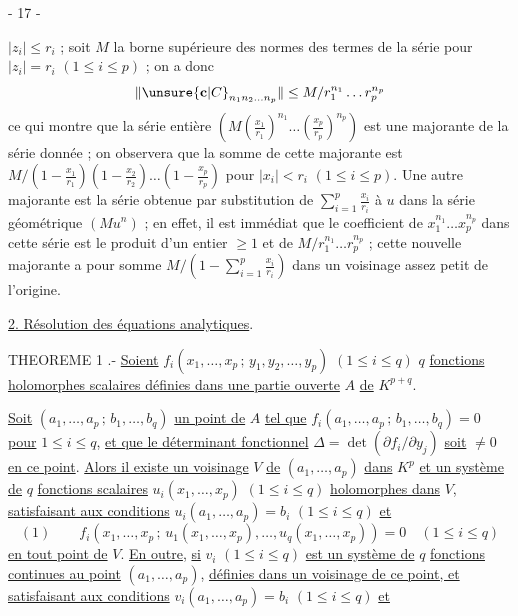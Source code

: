 
\begin{center}
- 17 -
\end{center}

$|z_i|\leq r_i$ ; soit $M$ la borne supérieure des normes des termes de la série
pour $|z_i|=r_i$ $(1\leq i\leq p)$ ; on a donc
\[
\|\unsure{\mathbf c|C}_{n_1n_2\ldots n_p}\|\leq M/r_1^{n_1}\ldots r_p^{n_p}
\]
ce qui montre que la série entière
$(M(\frac{x_1}{r_1})^{n_1}\ldots(\frac{x_p}{r_p})^{n_p})$
est une majorante de la série donnée ; on observera que la somme de cette majorante
est $M/(1-\frac{x_1}{r_1})(1-\frac{x_2}{r_2})\ldots(1-\frac{x_p}{r_p})$
pour $|x_i|<r_i$ $(1\leq i\leq p)$.
Une autre majorante est la série obtenue par substitution de
$\sum_{i=1}^p\frac{x_i}{r_i}$ à $u$ dans la série géométrique $(Mu^n)$ ;
en effet, il est immédiat que le coefficient de $x_1^{n_1}\ldots x_p^{n_p}$
dans cette série est le produit d'un entier $\geq1$ et de
$M/r_1^{n_1}\ldots r_p^{n_p}$ ; cette nouvelle majorante a pour somme
$M/(1-\sum_{i=1}^p\frac{x_i}{r_i})$ dans un voisinage assez petit de l'origine.

\uline{2. Résolution des équations analytiques}.

THEOREME 1 .- \uline{Soient}
$f_i(x_1,\ldots,x_p\,;\,y_1,y_2,\ldots,y_p)$ $(1\leq i\leq q)$
$q$ \uline{fonctions holomorphes scalaires définies dans une partie ouverte}
$A$ \uline{de} $K^{p+q}$.

\uline{Soit} $(a_1,\ldots,a_p\,;\,b_1,\ldots,b_q)$ \uline{un point de}
$A$ \uline{tel que}
$f_i(a_1,\ldots,a_p\,;\,b_1,\ldots,b_q)=0$ \uline{pour} $1\leq i\leq q$,
\uline{et que le déterminant fonctionnel}
$\Delta=\det(\partial f_i/\partial y_j)$ \uline{soit}
$\neq0$ \uline{en ce point}.
\uline{Alors il existe un voisinage} $V$ \uline{de} $(a_1,\ldots,a_p)$
\uline{dans} $K^p$ \uline{et un système de} $q$ \uline{fonctions scalaires}
$u_i(x_1,\ldots,x_p)$ $(1\leq i\leq q)$
\uline{holomorphes dans} $V$, \uline{satisfaisant aux conditions}
$u_i(a_1,\ldots,a_p)=b_i$ $(1\leq i\leq q)$ \uline{et}
\[
(1)\qquad
f_i(x_1,\ldots,x_p\,;\,u_1(x_1,\ldots,x_p),\ldots,u_q(x_1,\ldots,x_p))=0
\quad(1\leq i\leq q)
\]
\uline{en tout point de} $V$.
\uline{En outre}, \uline{si} $v_i$ $(1\leq i\leq q)$ \uline{est un système de}
$q$ \uline{fonctions continues au point} $(a_1,\ldots,a_p)$,
\uline{définies dans un voisinage de ce point, et satisfaisant aux conditions}
$v_i(a_1,\ldots,a_p)=b_i$ $(1\leq i\leq q)$ \uline{et}
